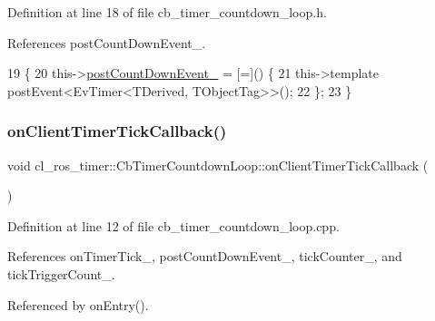 Definition at line 18 of file cb\+\_\+timer\+\_\+countdown\+\_\+loop.\+h.



References post\+Count\+Down\+Event\+\_\+.


\begin{DoxyCode}
19     \{
20         this->\hyperlink{classcl__ros__timer_1_1CbTimerCountdownLoop_aafc2594c2923e4a355394ffb339d1800}{postCountDownEvent\_} = [=]() \{
21             this->\textcolor{keyword}{template} postEvent<EvTimer<TDerived, TObjectTag>>();
22         \};
23     \}
\end{DoxyCode}
\mbox{\label{classcl__ros__timer_1_1CbTimerCountdownLoop_acb16f3448ad5955bf36e7c2cfd9f691c}} 
\subsubsection{\texorpdfstring{on\+Client\+Timer\+Tick\+Callback()}{onClientTimerTickCallback()}}
{\footnotesize\ttfamily void cl\+\_\+ros\+\_\+timer\+::\+Cb\+Timer\+Countdown\+Loop\+::on\+Client\+Timer\+Tick\+Callback (\begin{DoxyParamCaption}{ }\end{DoxyParamCaption})\hspace{0.3cm}{\ttfamily [private]}}



Definition at line 12 of file cb\+\_\+timer\+\_\+countdown\+\_\+loop.\+cpp.



References on\+Timer\+Tick\+\_\+, post\+Count\+Down\+Event\+\_\+, tick\+Counter\+\_\+, and tick\+Trigger\+Count\+\_\+.



Referenced by on\+Entry().


